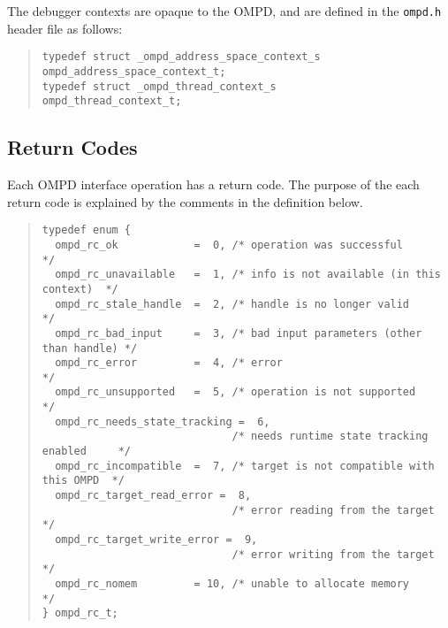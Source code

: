 The debugger contexts are opaque to the OMPD, and are defined
in the \texttt{ompd.h} header file as follows:


\begin{quote}
\begin{lstlisting}
typedef struct _ompd_address_space_context_s  ompd_address_space_context_t;
typedef struct _ompd_thread_context_s         ompd_thread_context_t;
\end{lstlisting}
\end{quote}

\subsection{Return Codes}
Each OMPD interface operation has a return code.
The purpose of the each return code is explained
by the comments in the definition below.
\begin{quote}
\begin{lstlisting}
typedef enum {
  ompd_rc_ok            =  0, /* operation was successful                 */
  ompd_rc_unavailable   =  1, /* info is not available (in this context)  */
  ompd_rc_stale_handle  =  2, /* handle is no longer valid                */
  ompd_rc_bad_input     =  3, /* bad input parameters (other than handle) */
  ompd_rc_error         =  4, /* error                                    */
  ompd_rc_unsupported   =  5, /* operation is not supported               */
  ompd_rc_needs_state_tracking =  6,
                              /* needs runtime state tracking enabled     */
  ompd_rc_incompatible  =  7, /* target is not compatible with this OMPD  */
  ompd_rc_target_read_error =  8,
                              /* error reading from the target            */
  ompd_rc_target_write_error =  9,
                              /* error writing from the target            */
  ompd_rc_nomem         = 10, /* unable to allocate memory                */
} ompd_rc_t;
\end{lstlisting}
\end{quote}

